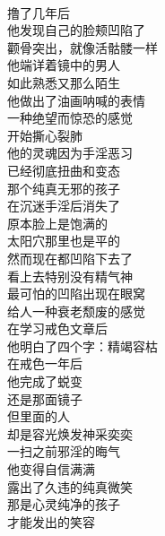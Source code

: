 \begin{poem}[凹陷的撸者]
    \begin{multicols}{3}
        \centering~\\
        撸了几年后 \\ 他发现自己的脸颊凹陷了 \\ 颧骨突出，就像活骷髅一样 \\ 他端详着镜中的男人 \\ 如此熟悉又那么陌生 \\ 他做出了油画呐喊的表情 \\ 一种绝望而惊恐的感觉 \\ 开始撕心裂肺 \\ 他的灵魂因为手淫恶习 \\ 已经彻底扭曲和变态 \\ 那个纯真无邪的孩子 \\ 在沉迷手淫后消失了 \\ 原本脸上是饱满的 \\ 太阳穴那里也是平的 \\ 然而现在都凹陷下去了 \\ 看上去特别没有精气神 \\ 最可怕的凹陷出现在眼窝 \\ 给人一种衰老颓废的感觉 \\ 在学习戒色文章后 \\ 他明白了四个字：精竭容枯 \\ 在戒色一年后 \\ 他完成了蜕变 \\ 还是那面镜子 \\ 但里面的人 \\ 却是容光焕发神采奕奕 \\ 一扫之前邪淫的晦气 \\ 他变得自信满满 \\ 露出了久违的纯真微笑 \\ 那是心灵纯净的孩子 \\ 才能发出的笑容
    \end{multicols}
\end{poem}


